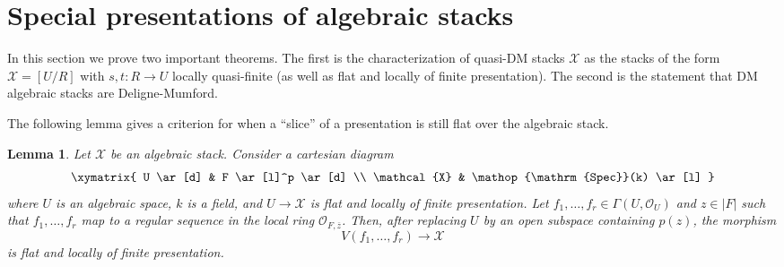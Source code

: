 \documentclass{stacks-project}
\theoremstyle{plain}
\newtheorem{lemma}[subsection]{Lemma}
\theoremstyle{definition}
\theoremstyle{remark}
\numberwithin{equation}{subsection}
\def\Spec{\mathop{\mathrm{Spec}}}
\begin{document}
\section{Special presentations of algebraic stacks}
\label{section-presentations}

\noindent
In this section we prove two important theorems.
The first is the characterization of quasi-DM stacks $\mathcal{X}$
as the stacks of the form $\mathcal{X} = [U/R]$ with $s, t : R \to U$ locally
quasi-finite (as well as flat and locally of finite presentation).
The second is the statement that DM algebraic stacks are Deligne-Mumford.

\medskip\noindent
The following lemma gives a criterion for when a ``slice''
of a presentation is still flat over the algebraic stack.

\begin{lemma}
\label{lemma-slice}
Let $\mathcal{X}$ be an algebraic stack.
Consider a cartesian diagram
$$
\xymatrix{
U \ar[d] & F \ar[l]^p \ar[d] \\
\mathcal{X} & \Spec(k) \ar[l]
}
$$
where $U$ is an algebraic space, $k$ is a field, and $U \to \mathcal{X}$
is flat and locally of finite presentation. Let
$f_1, \ldots, f_r \in \Gamma(U, \mathcal{O}_U)$
and $z \in |F|$ such that $f_1, \ldots, f_r$ map to a regular sequence
in the local ring $\mathcal{O}_{F, \overline{z}}$.
Then, after replacing $U$ by an open subspace containing $p(z)$, the morphism
$$
V(f_1, \ldots, f_r) \longrightarrow \mathcal{X}
$$
is flat and locally of finite presentation.
\end{lemma}
\end{document}
